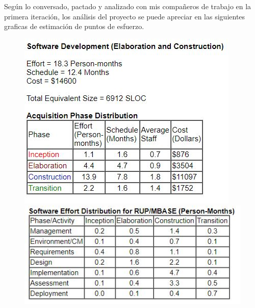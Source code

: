 Según lo conversado, pactado y analizado con mis compañeros de trabajo en la primera iteración, los análisis del proyecto se puede apreciar en las siguientes graficas de estimación de puntos de esfuerzo.
\begin{figure}[htbp]
	\includegraphics{1.JPG}
	\includegraphics[scale=0.9]{2.JPG}
\end{figure}

